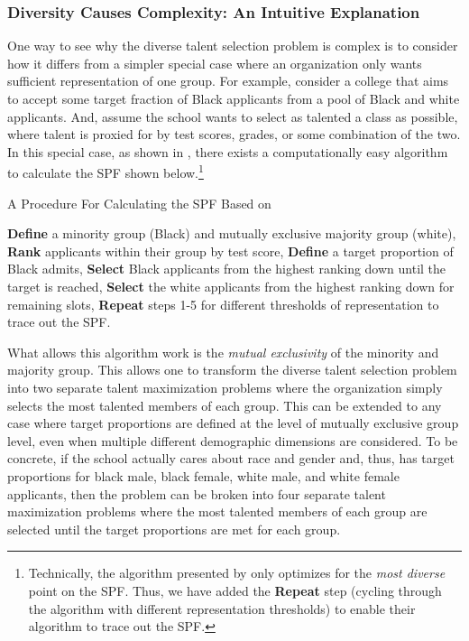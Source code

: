 \subsubsection{Diversity Causes Complexity: An Intuitive Explanation}\label{subsubsec:int_nphard}

One way to see why the diverse talent selection problem is complex is to consider how it differs from a simpler special case where an organization only wants sufficient representation of one group. For example, consider a college that aims to accept some target fraction of Black applicants from a pool of Black and white applicants. And, assume the school wants to select as talented a class as possible, where talent is proxied for by test scores, grades, or some combination of the two. In this special case, as shown in , there exists a computationally easy algorithm to calculate the SPF shown below.\footnote{Technically, the algorithm presented by  only optimizes for the \emph{most diverse} point on the SPF. Thus, we have added the \textbf{Repeat} step (cycling through the algorithm with different representation thresholds) to enable their algorithm to trace out the SPF.}

\begin{algorithm}
    \caption{A Procedure For Calculating the SPF Based on }\label{alg:kleinberg}
    \begin{algorithmic}
        \State \textbf{Define} a minority group (Black) and mutually exclusive majority group (white), 
        \State \textbf{Rank} applicants within their group by test score,
        \State \textbf{Define} a target proportion of Black admits,
        \State \textbf{Select} Black applicants from the highest ranking down until the target is reached,
        \State \textbf{Select} the white applicants from the highest ranking down for remaining slots,
        \State \textbf{Repeat} steps 1-5 for different thresholds of representation to trace out the SPF.
    \end{algorithmic}
\end{algorithm}

What allows this algorithm work is the \emph{mutual exclusivity} of the minority and majority group. This allows one to transform the diverse talent selection problem into two separate talent maximization problems where the organization simply selects the most talented members of each group. This can be extended to any case where target proportions are defined at the level of mutually exclusive group level, even when multiple different demographic dimensions are considered. To be concrete, if the school actually cares about race and gender and, thus, has target proportions for black male, black female, white male, and white female applicants, then the problem can be broken into four separate talent maximization problems where the most talented members of each group are selected until the target proportions are met for each group. 

